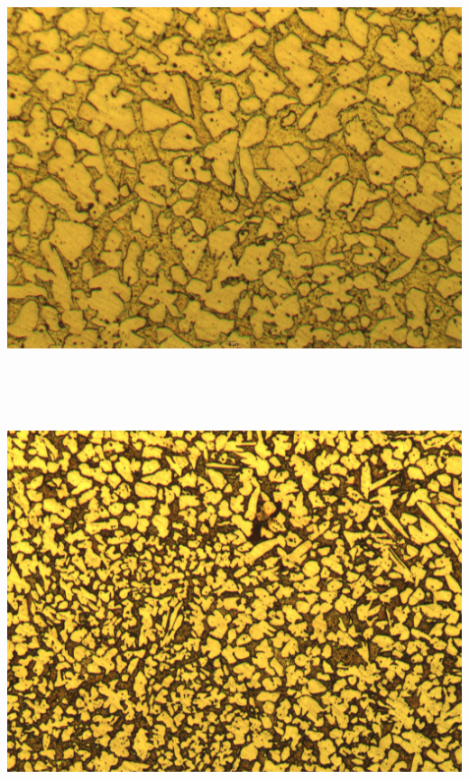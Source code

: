 \documentclass[german,  %
parskip=full,  %
]{scrartcl}
\begin{document}
\begin{minipage}{0.1\textwidth}\centering
\[\]
\end{minipage}
\begin{minipage}{0.45\textwidth}\centering
\includegraphics[scale=0.1]{Me_1Sch_25s_20x_001.jpg}
\end{minipage} \\\\\\
\begin{minipage}{0.45\textwidth}\centering
\includegraphics[scale=0.1]{Me_2Sch_5s_10x_001.jpg}
\end{minipage}
\end{document}
